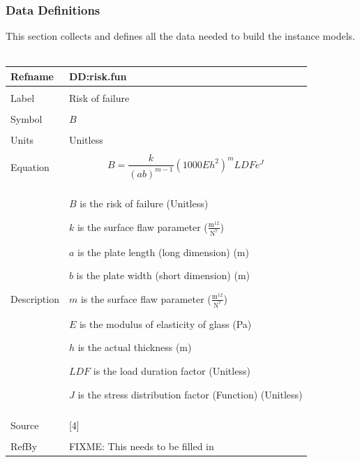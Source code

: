 \documentclass[12pt]{article}
\begin{document}
\subsubsection{Data Definitions}
\label{Sec:DDs}
This section collects and defines all the data needed to build the instance models.
~\newline
\noindent \begin{minipage}{\textwidth}
\begin{tabular}{p{} p{}}
\toprule \textbf{Refname} & \textbf{DD:risk.fun}
\label{DD:risk.fun}
\\ \midrule \\
Label & Risk of failure
\\ \midrule \\
Symbol & $B$
\\ \midrule \\
Units & Unitless
\\ \midrule \\
Equation & \begin{dmath}
           B=\frac{k}{\left(a b\right)^{m-1}} \left(1000 E h^{2}\right)^{m} LDF e^{J}
           \end{dmath}
\\ \midrule \\
Description & \begin{symbDescription}
              \item{$B$ is the risk of failure (Unitless)}
              \item{$k$ is the surface flaw parameter ($\frac{\text{m}^{12}}{\text{N}^{7}}$)}
              \item{$a$ is the plate length (long dimension) (m)}
              \item{$b$ is the plate width (short dimension) (m)}
              \item{$m$ is the surface flaw parameter ($\frac{\text{m}^{12}}{\text{N}^{7}}$)}
              \item{$E$ is the modulus of elasticity of glass (Pa)}
              \item{$h$ is the actual thickness (m)}
              \item{$LDF$ is the load duration factor (Unitless)}
              \item{$J$ is the stress distribution factor (Function) (Unitless)}
              \end{symbDescription}
\\ \midrule \\
Source & [4]
\\ \midrule \\
RefBy & FIXME: This needs to be filled in
\\ \bottomrule \end{tabular}
\end{minipage}\\
\end{document}
